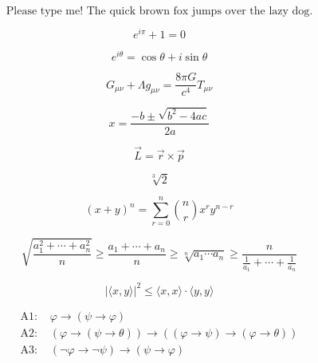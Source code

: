 \documentclass{article}
\begin{document}
\begin{equation}
    \text{Please type me! The quick brown fox jumps over the lazy dog.}
\end{equation}

\begin{equation}
    e^{i\pi} + 1 = 0
\end{equation}

\begin{equation}
    e^{i\theta} = \cos\theta + i\sin\theta
\end{equation}

\begin{equation}
    G_{\mu\nu} + \Lambda g_{\mu\nu} = \frac{8\pi G}{c^4} T_{\mu\nu}
\end{equation}

\begin{equation}
    x = \frac{-b \pm \sqrt{b^2 - 4ac}}{2a}
\end{equation}

\begin{equation}
    \vec{L} = \vec{r} \times \vec{p}
\end{equation}

\begin{equation}
    \sqrt[3]{2}
\end{equation}

\begin{equation}
    (x + y)^n = \sum_{r=0}^n \binom{n}{r} x^r y^{n-r}
\end{equation}

\begin{equation}
    \sqrt{\frac{a_1^2 + \cdots + a_n^2}{n}} \geq \frac{a_1 + \cdots + a_n}{n} \geq \sqrt[n]{a_1 \cdots a_n} \geq \frac{n}{\frac{1}{a_1} + \cdots + \frac{1}{a_n}}
\end{equation}

\begin{equation}
    | \langle x, y \rangle |^2 \leq \langle x, x \rangle \cdot \langle y, y \rangle
\end{equation}

\begin{equation}
\begin{aligned}
    \text{A1: } &\varphi \rightarrow (\psi \rightarrow \varphi) \\
    \text{A2: } &(\varphi \rightarrow (\psi \rightarrow \theta)) \rightarrow ((\varphi \rightarrow \psi) \rightarrow (\varphi \rightarrow \theta)) \\
    \text{A3: } &(\neg \varphi \rightarrow \neg \psi) \rightarrow (\psi \rightarrow \varphi)
\end{aligned}
\end{equation}
\end{document}
